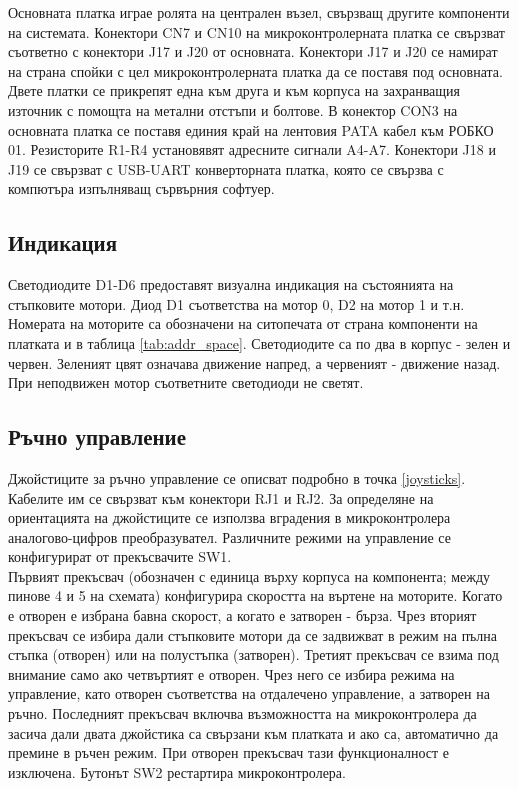 Основната платка играе ролята на централен възел, свързващ другите компоненти на системата. Конектори CN7 и CN10 на микроконтролерната платка се свързват съответно с конектори J17 и J20 от основната. Конектори J17 и J20 се намират на страна спойки с цел микроконтролерната платка да се поставя под основната. Двете платки се прикрепят една към друга и към корпуса на захранващия източник с помощта на метални отстъпи и болтове. В конектор CON3 на основната платка се поставя единия край на лентовия PATA кабел към РОБКО 01. Резисторите R1-R4 установявят адресните сигнали A4-A7. Конектори J18 и J19 се свързват с USB-UART конверторната платка, която се свързва с компютъра изпълняващ сървърния софтуер.
\subsection{Индикация}
Светодиодите D1-D6 предоставят визуална индикация на състоянията на стъпковите мотори. Диод D1 съответства на мотор 0, D2 на мотор 1 и т.н. Номерата на моторите са обозначени на ситопечата от страна компоненти на платката и в таблица \ref{tab:addr_space}. Светодиодите са по два в корпус - зелен и червен. Зеленият цвят означава движение напред, а червеният - движение назад. При неподвижен мотор съответните светодиоди не светят.
\subsection{Ръчно управление}
\label{manual_cntrl_section}
Джойстиците за ръчно управление се описват подробно в точка \ref{joysticks}. Кабелите им се свързват към конектори RJ1 и RJ2. За определяне на ориентацията на джойстиците се използва вградения в микроконтролера аналогово-цифров преобразувател. Различните режими на управление се конфигурират от прекъсвачите SW1.\\
\indent{}
Първият прекъсвач (обозначен с единица върху корпуса на компонента; между пинове 4 и 5 на схемата) конфигурира скоростта на въртене на моторите. Когато е отворен е избрана бавна скорост, а когато е затворен - бърза. Чрез вторият прекъсвач се избира дали стъпковите мотори да се задвижват в режим на пълна стъпка (отворен) или на полустъпка (затворен). Третият прекъсвач се взима под внимание само ако четвъртият е отворен. Чрез него се избира режима на управление, като отворен съответства на отдалечено управление, а затворен на ръчно. Последният прекъсвач включва възможността на микроконтролера да засича дали двата джойстика са свързани към платката и ако са, автоматично да премине в ръчен режим.
При отворен прекъсвач тази функционалност е изключена.
Бутонът SW2 рестартира микроконтролера.


